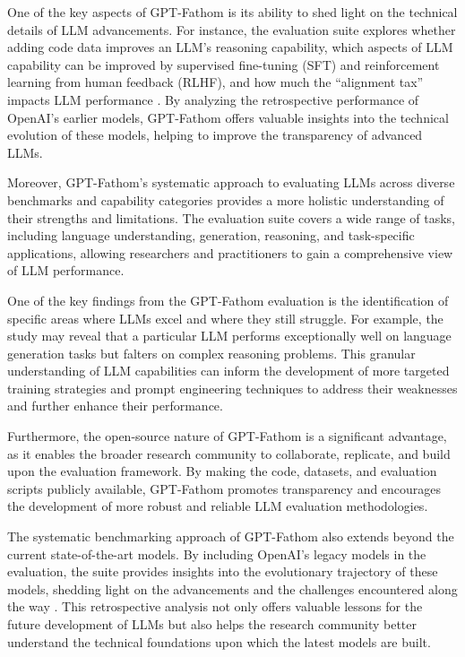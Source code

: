 \documentclass[11pt]{article}
\begin{document}
One of the key aspects of GPT-Fathom is its ability to shed light on the technical details of LLM advancements. For instance, the evaluation suite explores whether adding code data improves an LLM's reasoning capability, which aspects of LLM capability can be improved by supervised fine-tuning (SFT) and reinforcement learning from human feedback (RLHF), and how much the ``alignment tax'' impacts LLM performance \cite{ref83}. By analyzing the retrospective performance of OpenAI's earlier models, GPT-Fathom offers valuable insights into the technical evolution of these models, helping to improve the transparency of advanced LLMs.

Moreover, GPT-Fathom's systematic approach to evaluating LLMs across diverse benchmarks and capability categories provides a more holistic understanding of their strengths and limitations. The evaluation suite covers a wide range of tasks, including language understanding, generation, reasoning, and task-specific applications, allowing researchers and practitioners to gain a comprehensive view of LLM performance.

One of the key findings from the GPT-Fathom evaluation is the identification of specific areas where LLMs excel and where they still struggle. For example, the study may reveal that a particular LLM performs exceptionally well on language generation tasks but falters on complex reasoning problems. This granular understanding of LLM capabilities can inform the development of more targeted training strategies and prompt engineering techniques to address their weaknesses and further enhance their performance.

Furthermore, the open-source nature of GPT-Fathom is a significant advantage, as it enables the broader research community to collaborate, replicate, and build upon the evaluation framework. By making the code, datasets, and evaluation scripts publicly available, GPT-Fathom promotes transparency and encourages the development of more robust and reliable LLM evaluation methodologies.

The systematic benchmarking approach of GPT-Fathom also extends beyond the current state-of-the-art models. By including OpenAI's legacy models in the evaluation, the suite provides insights into the evolutionary trajectory of these models, shedding light on the advancements and the challenges encountered along the way \cite{ref83}. This retrospective analysis not only offers valuable lessons for the future development of LLMs but also helps the research community better understand the technical foundations upon which the latest models are built.
\end{document}
